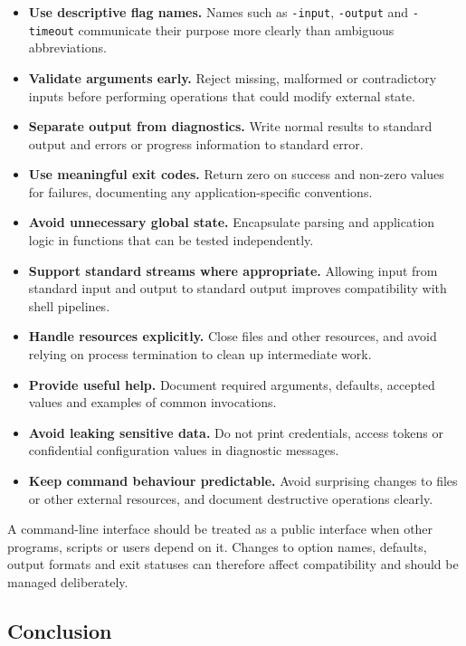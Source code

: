 \begin{itemize}
    \item \textbf{Use descriptive flag names.} Names such as \texttt{-input}, \texttt{-output} and \texttt{-timeout} communicate their purpose more clearly than ambiguous abbreviations.
    \item \textbf{Validate arguments early.} Reject missing, malformed or contradictory inputs before performing operations that could modify external state.
    \item \textbf{Separate output from diagnostics.} Write normal results to standard output and errors or progress information to standard error.
    \item \textbf{Use meaningful exit codes.} Return zero on success and non-zero values for failures, documenting any application-specific conventions.
    \item \textbf{Avoid unnecessary global state.} Encapsulate parsing and application logic in functions that can be tested independently.
    \item \textbf{Support standard streams where appropriate.} Allowing input from standard input and output to standard output improves compatibility with shell pipelines.
    \item \textbf{Handle resources explicitly.} Close files and other resources, and avoid relying on process termination to clean up intermediate work.
    \item \textbf{Provide useful help.} Document required arguments, defaults, accepted values and examples of common invocations.
    \item \textbf{Avoid leaking sensitive data.} Do not print credentials, access tokens or confidential configuration values in diagnostic messages.
    \item \textbf{Keep command behaviour predictable.} Avoid surprising changes to files or other external resources, and document destructive operations clearly.
\end{itemize}

A command-line interface should be treated as a public interface when other programs, scripts or users depend on it. Changes to option names, defaults, output formats and exit statuses can therefore affect compatibility and should be managed deliberately.

\subsection{Conclusion}

